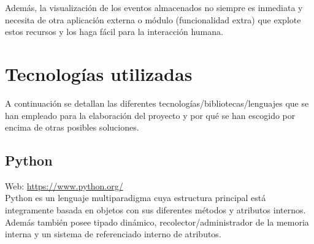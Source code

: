 Además, la visualización de los eventos almacenados no siempre es inmediata y necesita de otra aplicación externa o módulo (funcionalidad extra) que explote estos recursos y los haga fácil para la interacción humana.\\

\section{Tecnologías utilizadas}

A continuación se detallan las diferentes tecnologías/bibliotecas/lenguajes que se han empleado para la elaboración del proyecto y por qué se han escogido por encima de otras posibles soluciones.

\subsection{Python}


Web: \url{https://www.python.org/}\\

Python es un lenguaje multiparadigma cuya estructura principal está integramente basada en objetos con sus diferentes métodos y atributos internos. Además también posee tipado dinámico, recolector/administrador de la memoria interna y un sistema de referenciado interno de atributos. \\

